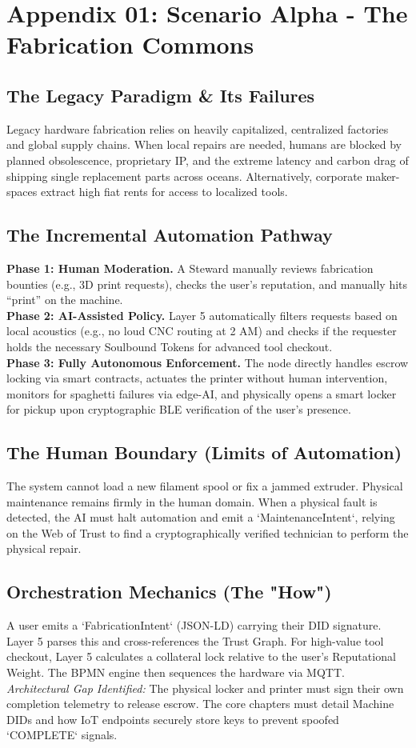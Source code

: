 \chapter{Appendix 01: Scenario Alpha - The Fabrication Commons}

\section{The Legacy Paradigm \& Its Failures}
Legacy hardware fabrication relies on heavily capitalized, centralized factories and global supply chains. When local repairs are needed, humans are blocked by planned obsolescence, proprietary IP, and the extreme latency and carbon drag of shipping single replacement parts across oceans. Alternatively, corporate maker-spaces extract high fiat rents for access to localized tools.

\section{The Incremental Automation Pathway}
\textbf{Phase 1: Human Moderation.} A Steward manually reviews fabrication bounties (e.g., 3D print requests), checks the user's reputation, and manually hits ``print'' on the machine. \\
\textbf{Phase 2: AI-Assisted Policy.} Layer 5 automatically filters requests based on local acoustics (e.g., no loud CNC routing at 2 AM) and checks if the requester holds the necessary Soulbound Tokens for advanced tool checkout. \\
\textbf{Phase 3: Fully Autonomous Enforcement.} The node directly handles escrow locking via smart contracts, actuates the printer without human intervention, monitors for spaghetti failures via edge-AI, and physically opens a smart locker for pickup upon cryptographic BLE verification of the user's presence.

\section{The Human Boundary (Limits of Automation)}
The system cannot load a new filament spool or fix a jammed extruder. Physical maintenance remains firmly in the human domain. When a physical fault is detected, the AI must halt automation and emit a `MaintenanceIntent`, relying on the Web of Trust to find a cryptographically verified technician to perform the physical repair.

\section{Orchestration Mechanics (The "How")}
A user emits a `FabricationIntent` (JSON-LD) carrying their DID signature. Layer 5 parses this and cross-references the Trust Graph. For high-value tool checkout, Layer 5 calculates a collateral lock relative to the user's Reputational Weight. The BPMN engine then sequences the hardware via MQTT.
\textit{Architectural Gap Identified:} The physical locker and printer must sign their own completion telemetry to release escrow. The core chapters must detail Machine DIDs and how IoT endpoints securely store keys to prevent spoofed `COMPLETE` signals.
